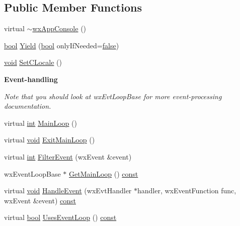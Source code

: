 \subsection*{Public Member Functions}
\begin{DoxyCompactItemize}
\item 
virtual \hyperlink{classwx_app_console_a15802038794a8646f42f0cdd3bf74b3d}{$\sim$wx\+App\+Console} ()
\item 
\hyperlink{mac_2config_2i386_2lib-src_2libsoxr_2soxr-config_8h_abb452686968e48b67397da5f97445f5b}{bool} \hyperlink{classwx_app_console_a302adeb701f247bf8cac1570efc25020}{Yield} (\hyperlink{mac_2config_2i386_2lib-src_2libsoxr_2soxr-config_8h_abb452686968e48b67397da5f97445f5b}{bool} only\+If\+Needed=\hyperlink{mac_2config_2i386_2lib-src_2libsoxr_2soxr-config_8h_a65e9886d74aaee76545e83dd09011727}{false})
\item 
\hyperlink{sound_8c_ae35f5844602719cf66324f4de2a658b3}{void} \hyperlink{classwx_app_console_a9a02416d2eeaf63b0cb9313dad69bb0f}{Set\+C\+Locale} ()
\end{DoxyCompactItemize}
\begin{Indent}{\bf Event-\/handling}\par
{\em Note that you should look at wx\+Evt\+Loop\+Base for more event-\/processing documentation. }\begin{DoxyCompactItemize}
\item 
virtual \hyperlink{xmltok_8h_a5a0d4a5641ce434f1d23533f2b2e6653}{int} \hyperlink{classwx_app_console_a14523f3e9ab468c19c697c65484b36db}{Main\+Loop} ()
\item 
virtual \hyperlink{sound_8c_ae35f5844602719cf66324f4de2a658b3}{void} \hyperlink{classwx_app_console_ad0f1e724efa8ae1e94cde655c74c85dc}{Exit\+Main\+Loop} ()
\item 
virtual \hyperlink{xmltok_8h_a5a0d4a5641ce434f1d23533f2b2e6653}{int} \hyperlink{classwx_app_console_ada7ab606e014a10d46e4b3c6f602e20c}{Filter\+Event} (wx\+Event \&event)
\item 
wx\+Event\+Loop\+Base $\ast$ \hyperlink{classwx_app_console_a131ba350b1be3ef88a764170c59d8e40}{Get\+Main\+Loop} () \hyperlink{getopt1_8c_a2c212835823e3c54a8ab6d95c652660e}{const} 
\item 
virtual \hyperlink{sound_8c_ae35f5844602719cf66324f4de2a658b3}{void} \hyperlink{classwx_app_console_a78a6f9e56b77addf8251f0f5c10004fb}{Handle\+Event} (wx\+Evt\+Handler $\ast$handler, wx\+Event\+Function func, wx\+Event \&event) \hyperlink{getopt1_8c_a2c212835823e3c54a8ab6d95c652660e}{const} 
\item 
virtual \hyperlink{mac_2config_2i386_2lib-src_2libsoxr_2soxr-config_8h_abb452686968e48b67397da5f97445f5b}{bool} \hyperlink{classwx_app_console_af393b68a318373e43ee731bec38bdc29}{Uses\+Event\+Loop} () \hyperlink{getopt1_8c_a2c212835823e3c54a8ab6d95c652660e}{const} 
\end{DoxyCompactItemize}
\end{Indent}
